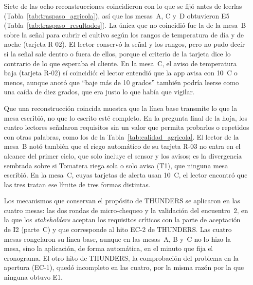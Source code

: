 \documentclass[12pt,letterpaper,oneside]{report}
\begin{document}
Siete de las ocho reconstrucciones coincidieron con lo que se fijó antes de
leerlas (Tabla~\ref{tab:traspaso_agricola}), así que las mesas~A, C y~D
obtuvieron E5 (Tabla~\ref{tab:traspaso_resultados}). La única que no coincidió
fue la de la mesa~B sobre la señal para cubrir el cultivo según los rangos de
temperatura de día y de noche (tarjeta R-02). El lector conservó la señal y los
rangos, pero no pudo decir si la señal sale dentro o fuera de ellos, porque el
criterio de la tarjeta dice lo contrario de lo que esperaba el cliente. En la
mesa~C, el aviso de temperatura baja (tarjeta R-02) sí coincidió: el lector
entendió que la app avisa con 10~\textdegree C o menos, aunque anotó que ``baje
más de 10 grados'' también podría leerse como una caída de diez grados, que era
justo lo que había que vigilar.

Que una reconstrucción coincida muestra que la línea base transmite lo que la
mesa escribió, no que lo escrito esté completo. En la pregunta final de la hoja,
los cuatro lectores señalaron requisitos sin un valor que permita probarlos o
repetidos con otras palabras, como los de la Tabla~\ref{tab:calidad_agricola}.
El lector de la mesa~B notó también que el riego automático de su tarjeta R-03
no entra en el alcance del primer ciclo, que solo incluye el sensor y los
avisos; es la divergencia sembrada sobre si Tomatera riega sola o solo avisa
(T1), que ninguna mesa escribió. En la mesa~C, cuyas tarjetas de alerta usan
10~\textdegree C, el lector encontró que las tres tratan ese límite de tres
formas distintas.

Los mecanismos que conservan el propósito de THUNDERS se aplicaron en las cuatro
mesas: las dos rondas de micro-chequeo y la validación del encuentro~2, en la
que los \textit{stakeholders} aceptan los requisitos críticos con la parte de
aceptación de I2 (parte~C) y que corresponde al hito EC-2 de THUNDERS. Las
cuatro mesas congelaron su línea base, aunque en las mesas~A, B y~C no lo hizo
la mesa, sino la aplicación, de forma automática, en el minuto que fija el
cronograma. El otro hito de THUNDERS, la comprobación del problema en la
apertura (EC-1), quedó incompleto en las cuatro, por la misma razón por la que
ninguna obtuvo E1.
\end{document}
